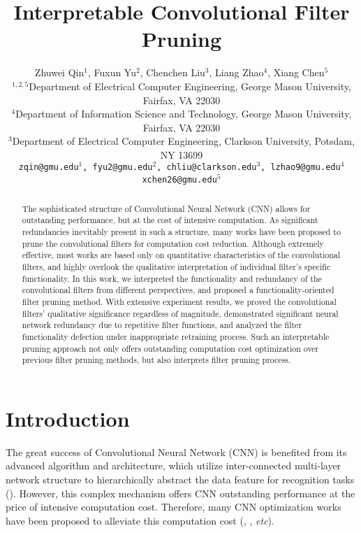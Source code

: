 \documentclass{article} %
\title{Interpretable Convolutional Filter Pruning}
\author{
	Zhuwei Qin$^1$, Fuxun Yu$^2$, Chenchen Liu$^3$, Liang Zhao$^4$, Xiang Chen$^5$ \\
	$^{1,2,5}$Department of Electrical Computer Engineering, George Mason University, Fairfax, VA 22030 \\
	$^{4}$Department of Information Science and Technology, George Mason University, Fairfax, VA 22030 \\
	$^{3}$Department of Electrical Computer Engineering, Clarkson University, Potsdam, NY 13699 \\
	\texttt{zqin@gmu.edu$^1$, fyu2@gmu.edu$^2$, chliu@clarkson.edu$^3$, lzhao9@gmu.edu$^4$}\\
	\texttt{xchen26@gmu.edu$^5$}
}
\begin{document}
\maketitle

\vspace{-3mm}
\begin{abstract}
The sophisticated structure of Convolutional Neural Network (CNN) allows for outstanding performance, but at the cost of intensive computation.
	As significant redundancies inevitably present in such a structure, many works have been proposed to prune the convolutional filters for computation cost reduction.
	Although extremely effective, most works are based only on quantitative characteristics of the convolutional filters, and highly overlook the qualitative interpretation of individual filter's specific functionality.
	In this work, we interpreted the functionality and redundancy of the convolutional filters from different perspectives, and proposed a functionality-oriented filter pruning method.
	With extensive experiment results, we proved the convolutional filters' qualitative significance regardless of magnitude, demonstrated significant neural network redundancy due to repetitive filter functions, and analyzed the filter functionality defection under inappropriate retraining process.
	Such an interpretable pruning approach not only offers outstanding computation cost optimization over previous filter pruning methods, but also interprets filter pruning process.



\end{abstract}
\section{Introduction}
The great success of Convolutional Neural Network (CNN) is benefited from its advanced algorithm and architecture, which utilize inter-connected multi-layer network structure to hierarchically abstract the data feature for recognition tasks (\cite{Kriz:2012:NIPS}).
	However, this complex mechanism offers CNN outstanding performance at the price of intensive computation cost.
	Therefore, many CNN optimization works have been proposed to alleviate this computation cost (\cite{han2015learning}, \cite{jaderberg2014speeding}, \textit{etc}).
\end{document}
